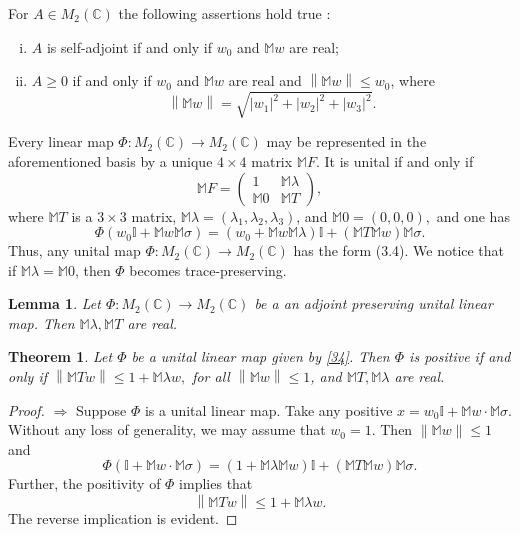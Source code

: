 \documentclass[11pt,reqno]{amsart}
\newtheorem{theorem}[subsection]{Theorem}
\newtheorem{lemma}[subsection]{Lemma}
\theoremstyle{definition}
\numberwithin{equation}{section} \setcounter{tocdepth}{1}
\def\bm{{\mathbb M}}
\newcommand{\norm}[1]{\left \lVert #1 \right \rVert}
\numberwithin{equation}{section}
\begin{document}
\noindent For $A\in M_2(\mathbb{C})$ the following assertions hold true \cite{king_minimal_2001}:
     \begin{enumerate}[(i)]
         \item $A$ is self-adjoint if and only if $w_0$ and $\bm{w}$ are real;
         \item $A \geq 0$ if and only if $w_0$ and $\bm{w}$ are real and $\norm{\bm{w}} \leq w_0$, where $$\norm{\bm{w}}=\sqrt{|w_1|^2+|w_2|^2+|w_3|^2}.$$
     \end{enumerate}


\noindent Every linear map $\Phi:M_2(\mathbb{C}) \rightarrow M_2(\mathbb{C})$ may be represented in the aforementioned basis by a unique $4\times 4$ matrix $\bm{F}.$ It is unital if and only if
\begin{equation}
    \bm{F}=\begin{pmatrix}
        1 & \bm{\lambda}\\
        \bm{0} & \bm{T}
    \end{pmatrix},
\end{equation}where $\bm{T}$ is a $3\times 3$ matrix, $\bm{\lambda}=(\lambda_1,\lambda_2,\lambda_3)$, and $\bm{0}=(0,0,0),$ and one has \begin{equation}\label{34}
         \Phi(w_0\mathbb{I}+\bm{w}\bm{\sigma})=(w_0+\bm{w}\bm{\lambda})\mathbb{I}+(\bm{T}\bm{w})\bm{\sigma}.
     \end{equation}
\noindent Thus, any unital map $\Phi:M_2(\mathbb{C}) \rightarrow M_2(\mathbb{C})$ has the form (3.4). We notice that if $\bm{\lambda}=\bm{0}$, then $\Phi$ becomes trace-preserving. \\

\begin{lemma}
       Let $\Phi:M_2(\mathbb{C}) \rightarrow M_2(\mathbb{C})$ be a an adjoint preserving unital linear map. Then $\bm{\lambda},\bm{T}$ are real.
      \end{lemma}

\begin{theorem}
      Let $\Phi$ be a unital linear map given by \eqref{34}. Then $\Phi$ is positive if and only if $\norm{\bm{Tw}} \leq 1+ \bm{\lambda w},$ for all $\norm{\bm{w}} \leq 1$, and $\bm{T}, \bm{\lambda}$ are real.
  \end{theorem}
  \begin{proof}
  $\Rightarrow$
      Suppose $\Phi$ is a unital linear map. Take any positive $x=w_0 \mathbb{I}+\bm{w}\cdot \bm{\sigma}$. Without any loss of generality, we may assume that $w_0=1$. Then $\|\bm{w}\|\leq 1$ and $$\Phi(\mathbb{I}+\bm{w}\cdot \bm{\sigma})=(1+\bm{\lambda}\bm{w})\mathbb{I}+(\bm{T}\bm{w})\bm{\sigma}.$$
      Further, the positivity of $\Phi$ implies that \begin{equation}
          \norm{\bm{Tw}}\leq {1+\bm{\lambda w}}.
      \end{equation}
The reverse implication is evident.
\end{proof}
\end{document}
